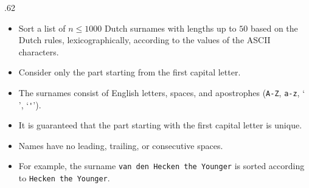 \begin{frame}[fragile]
    \frametitle{\problemtitle}

    \begin{columns}
        \begin{column}[T]{.62\textwidth}
            \begin{itemize}
                \item Sort a list of $n\leq 1000$ Dutch surnames with lengths up to $50$ based on the Dutch rules,
                    lexicographically, according to the values of the ASCII characters.
                \item Consider only the part starting from the first capital letter.
                \item The surnames consist of English letters, spaces, and apostrophes
                    (\texttt{A-Z}, \texttt{a-z}, `\texttt{ }', `\verb|'|').
                \item It is guaranteed that the part starting with the first capital letter is unique.
                \item Names have no leading, trailing, or consecutive spaces.
                \item For example, the surname \texttt{van den Hecken the Younger} is sorted according to \texttt{Hecken the Younger}.
            \end{itemize}



        \end{column}

    \end{columns}
\end{frame}
